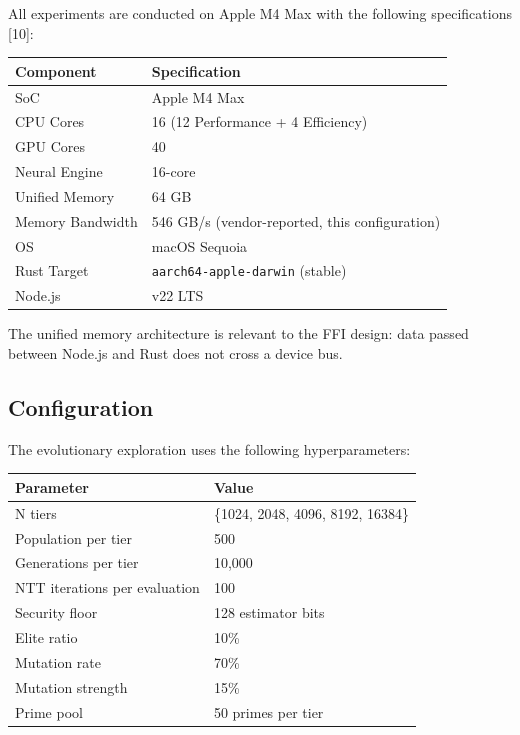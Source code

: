All experiments are conducted on Apple M4 Max with the following specifications [10]:

{\def\LTcaptype{none} %
\begin{longtable}[]{@{}ll@{}}
\toprule\noalign{}
Component & Specification \\
\midrule\noalign{}
\endhead
\bottomrule\noalign{}
\endlastfoot
SoC & Apple M4 Max \\
CPU Cores & 16 (12 Performance + 4 Efficiency) \\
GPU Cores & 40 \\
Neural Engine & 16-core \\
Unified Memory & 64 GB \\
Memory Bandwidth & 546 GB/s (vendor-reported, this configuration) \\
OS & macOS Sequoia \\
Rust Target & \texttt{aarch64-apple-darwin} (stable) \\
Node.js & v22 LTS \\
\end{longtable}
}

The unified memory architecture is relevant to the FFI design: data passed between Node.js and Rust does not cross a device bus.

\subsection{Configuration}\label{configuration}

The evolutionary exploration uses the following hyperparameters:

{\def\LTcaptype{none} %
\begin{longtable}[]{@{}ll@{}}
\toprule\noalign{}
Parameter & Value \\
\midrule\noalign{}
\endhead
\bottomrule\noalign{}
\endlastfoot
N tiers & \{1024, 2048, 4096, 8192, 16384\} \\
Population per tier & 500 \\
Generations per tier & 10,000 \\
NTT iterations per evaluation & 100 \\
Security floor & 128 estimator bits \\
Elite ratio & 10\% \\
Mutation rate & 70\% \\
Mutation strength & 15\% \\
Prime pool & 50 primes per tier \\
\end{longtable}
}

